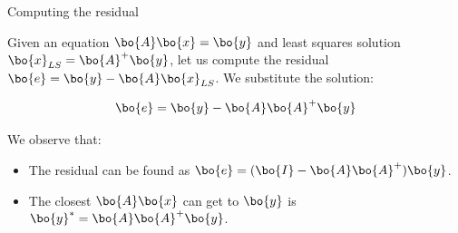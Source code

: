 \documentclass{beamer}
\begin{document}
\begin{frame}{Computing the residual}
	\begin{flushleft}
		
		Given an equation $\bo{A}\bo{x} = \bo{y}$ and least squares solution $\bo{x}_{LS} = \bo{A}^+\bo{y}$, let us compute the residual $\bo{e} = \bo{y} - \bo{A}\bo{x}_{LS}$. We substitute the solution:
		 
		\begin{equation}
			\bo{e} = \bo{y} - \bo{A}\bo{A}^+\bo{y}
		\end{equation}
		
		We observe that:
		
		\begin{itemize}
			\item The residual can be found as $\bo{e} = (\bo{I} - \bo{A}\bo{A}^+)\bo{y}$.
			
			\item The closest $\bo{A}\bo{x}$ can get to $\bo{y}$ is $\bo{y}^* = \bo{A}\bo{A}^+\bo{y}$.
			
		\end{itemize}
		
	\end{flushleft}
\end{frame}
\end{document}
